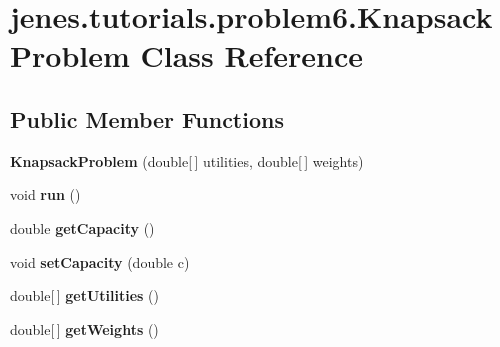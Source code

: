 \hypertarget{classjenes_1_1tutorials_1_1problem6_1_1_knapsack_problem}{
\section{jenes.tutorials.problem6.KnapsackProblem Class Reference}
\label{classjenes_1_1tutorials_1_1problem6_1_1_knapsack_problem}
}
\subsection*{Public Member Functions}
\begin{CompactItemize}
\item 
\hypertarget{classjenes_1_1tutorials_1_1problem6_1_1_knapsack_problem_5c921b1c3d9dbbe35decc777cf59169d}{
\textbf{KnapsackProblem} (double\mbox{[}$\,$\mbox{]} utilities, double\mbox{[}$\,$\mbox{]} weights)}
\label{classjenes_1_1tutorials_1_1problem6_1_1_knapsack_problem_5c921b1c3d9dbbe35decc777cf59169d}

\item 
\hypertarget{classjenes_1_1tutorials_1_1problem6_1_1_knapsack_problem_174433680cf824c4238f690d84a43e38}{
void \textbf{run} ()}
\label{classjenes_1_1tutorials_1_1problem6_1_1_knapsack_problem_174433680cf824c4238f690d84a43e38}

\item 
\hypertarget{classjenes_1_1tutorials_1_1problem6_1_1_knapsack_problem_f5b99c0408de24f2d7598f14dc597ef7}{
double \textbf{getCapacity} ()}
\label{classjenes_1_1tutorials_1_1problem6_1_1_knapsack_problem_f5b99c0408de24f2d7598f14dc597ef7}

\item 
\hypertarget{classjenes_1_1tutorials_1_1problem6_1_1_knapsack_problem_9caf9c53d4ce0e4b17ceb163ee8ab837}{
void \textbf{setCapacity} (double c)}
\label{classjenes_1_1tutorials_1_1problem6_1_1_knapsack_problem_9caf9c53d4ce0e4b17ceb163ee8ab837}

\item 
\hypertarget{classjenes_1_1tutorials_1_1problem6_1_1_knapsack_problem_1eddd1274f86fe1b3e61668f072dc364}{
double\mbox{[}$\,$\mbox{]} \textbf{getUtilities} ()}
\label{classjenes_1_1tutorials_1_1problem6_1_1_knapsack_problem_1eddd1274f86fe1b3e61668f072dc364}

\item 
\hypertarget{classjenes_1_1tutorials_1_1problem6_1_1_knapsack_problem_3f94e77e8f2ea920b9ec1dede3ed53f8}{
double\mbox{[}$\,$\mbox{]} \textbf{getWeights} ()}
\label{classjenes_1_1tutorials_1_1problem6_1_1_knapsack_problem_3f94e77e8f2ea920b9ec1dede3ed53f8}

\end{CompactItemize}
